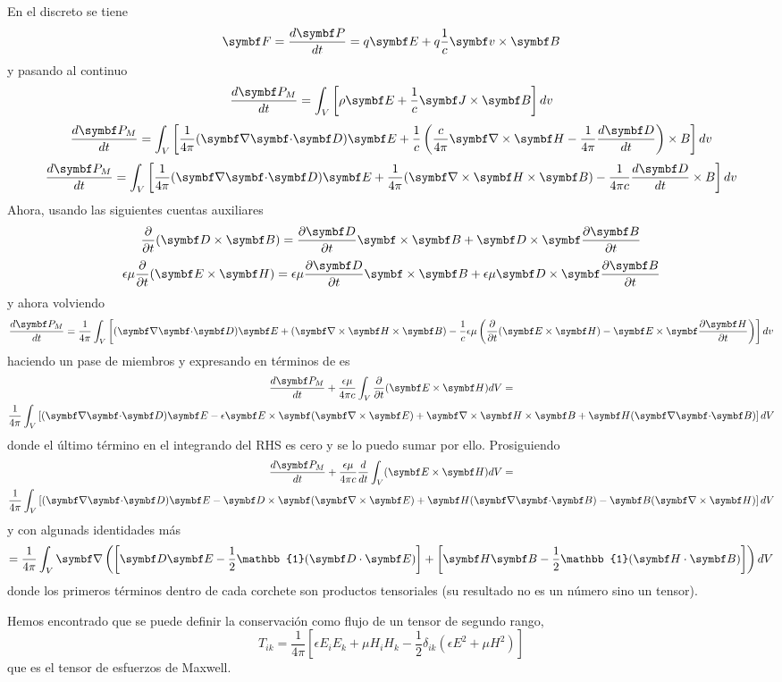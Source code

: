 \documentclass[10pt,oneside]{CBFT_book}
\begin{document}
En el discreto se tiene
\[
	\vb{F} = \dtot{\vb{P}}{t} = q\vb{E} + q\frac{1}{c} \pv{v}{B} 
\]
y pasando al continuo
\[
	\dtot{\vb{P}_M}{t} = \int_V \left[ \rho\vb{E} + \frac{1}{c} \pv{J}{B}  \right] dv
\]
\[
	\dtot{\vb{P}_M}{t} = \int_V \left[ \frac{1}{4\pi} (\divem{D}) \vb{E} + 
	\frac{1}{c} \left( \frac{c}{4\pi}\rotorm{H} - \frac{1}{4\pi}\dtot{\vb{D}}{t} \right)\times {B} \right] dv
\]
\[
	\dtot{\vb{P}_M}{t} = \int_V \left[ \frac{1}{4\pi} (\divem{D}) \vb{E} +  
	\frac{1}{4\pi} (\Nabla\times\vb{H}\times\vb{B}) - \frac{1}{4\pi c}\dtot{\vb{D}}{t}\times {B} \right] dv
\]
Ahora, usando las siguientes cuentas auxiliares
\[
	\dpar{}{t}(\pv{D}{B}) = \dpar{\vb{D}}{t}\pv{}{B} + \pv{D}{}\dpar{\vb{B}}{t}
\]
\[
	\epsilon\mu\dpar{}{t}(\pv{E}{H}) = \epsilon\mu\dpar{\vb{D}}{t}\pv{}{B} + \epsilon\mu\pv{D}{}\dpar{\vb{B}}{t}
\]
y ahora volviendo
\[
	\dtot{\vb{P}_M}{t} = \frac{1}{4\pi} \int_V \left[  (\divem{D}) \vb{E} + (\Nabla\times\vb{H}\times\vb{B}) 
	-\frac{1}{c}\epsilon\mu \left( \dpar{}{t}(\pv{E}{H}) - \pv{E}{}\dpar{\vb{H}}{t} \right) \right] dv	
\]
haciendo un pase de miembros y expresando  en términos de  es
\begin{multline*}
	\dtot{\vb{P}_M}{t} + \frac{\epsilon\mu }{4\pi c} \int_V \dpar{}{t}(\pv{E}{H}) dV = \\
	\frac{1}{4\pi} \int_V \left[  (\divem{D}) \vb{E} - \epsilon \pv{E}{}(\Nabla\times\vb{E}) +
	\rotorm{H}\times\vb{B} + \vb{H}(\divem{B}) \right] dV	 
\end{multline*}
donde el último término en el integrando del RHS es cero y se lo puedo sumar por ello.
Prosiguiendo
\begin{multline*}
	\dtot{\vb{P}_M}{t} + \frac{\epsilon\mu }{4\pi c} \dtot{}{t}\int_V (\pv{E}{H}) dV = \\
	\frac{1}{4\pi} \int_V \left[  (\divem{D}) \vb{E} - \pv{D}{}(\Nabla\times\vb{E}) +
	\vb{H}(\divem{B}) - \vb{B}(\rotorm{H}) \right] dV	
\end{multline*}
y con algunads identidades más
\[
	= \frac{1}{4\pi} \int_V \Nabla\left( \left[ \vb{D}\vb{E} - \frac{1}{2}\mathbb{1}( \pe{D}{E}) \right] + 
		\left[ \vb{H}\vb{B} - \frac{1}{2}\mathbb{1}(\pe{H}{B}) \right] \right) dV
\]
donde los primeros términos dentro de cada corchete son productos tensoriales (su resultado no es un
número sino un tensor).

Hemos encontrado que se puede definir la conservación como flujo de un tensor de segundo rango,
\[
	T_{ik} = \frac{1}{4\pi}\left[ \epsilon E_iE_k + \mu H_iH_k - \frac{1}{2}\delta_{ik}
	( \epsilon E^2 + \mu H^2)\right]
\]
que es el tensor de esfuerzos de Maxwell.
\end{document}
